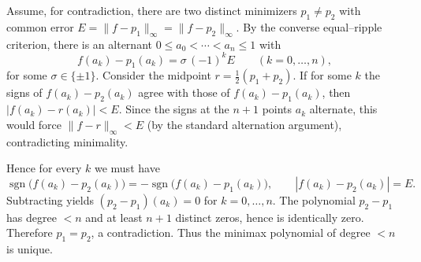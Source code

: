 \begin{solution}
Assume, for contradiction, there are two distinct minimizers $p_1\ne p_2$ with common error
$E=\|f-p_1\|_\infty=\|f-p_2\|_\infty$. By the converse equal--ripple criterion, there is an alternant
$0\le a_0<\cdots<a_n\le 1$ with
\[
f(a_k)-p_1(a_k)=\sigma\,(-1)^k E\qquad (k=0,\dots,n),
\]
for some $\sigma\in\{\pm1\}$. Consider the midpoint $r=\tfrac12(p_1+p_2)$.
If for some $k$ the signs of $f(a_k)-p_2(a_k)$ agree with those of $f(a_k)-p_1(a_k)$, then
$|f(a_k)-r(a_k)|<E$. Since the signs at the $n+1$ points $a_k$ alternate, this would force
$\|f-r\|_\infty<E$ (by the standard alternation argument), contradicting minimality.

Hence for every $k$ we must have
\[
\operatorname{sgn}\!\bigl(f(a_k)-p_2(a_k)\bigr)=-\operatorname{sgn}\!\bigl(f(a_k)-p_1(a_k)\bigr),
\qquad |f(a_k)-p_2(a_k)|=E .
\]
Subtracting yields $(p_2-p_1)(a_k)=0$ for $k=0,\dots,n$. The polynomial $p_2-p_1$ has degree $<n$
and at least $n+1$ distinct zeros, hence is identically zero. Therefore $p_1=p_2$, a contradiction.
Thus the minimax polynomial of degree $<n$ is unique.

\bigskip
\end{solution}

